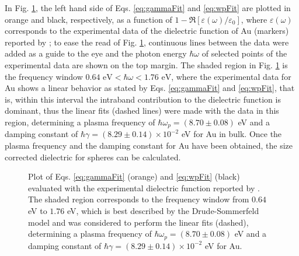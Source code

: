 In Fig. \ref{fig:DrudeFit}, the left hand side of Eqs. \eqref{eq:gammaFit}  and \eqref{eq:wpFit} are plotted in orange and black, respectively, as a function of $1-\Re[\varepsilon(\omega)/ \varepsilon_0]$, where $\varepsilon(\omega)$  corresponds to the experimental data of the dielectric function of Au (markers) reported by \citeauthor{johnson_optical_1972} \cite{johnson_optical_1972}; to ease the read of Fig. \ref{fig:DrudeFit}, continuous lines between the data were added as a guide to the eye and the photon energy $\hbar\omega$ of selected points of the experimental data are shown on the top margin. The shaded region in Fig. \ref{fig:DrudeFit} is the frequency window $0.64\text{ eV} < \hbar\omega < 1.76 \text{ eV}$, where the experimental data for Au shows a linear behavior as stated by Eqs. \eqref{eq:gammaFit}  and \eqref{eq:wpFit}, that is, within this interval  the intraband contribution to the dielectric function is dominant, thus the linear fits (dashed lines) were made with the data in this region, determining a plasma frequency of $\hbar\omega_p =(8.70\pm0.08)$ eV and a damping constant of $\hbar\gamma = (8.29 \pm 0.14)\times 10^{-2}$ eV for Au in bulk. Once the plasma frequency and the damping constant for Au have been obtained, the size corrected dielectric for spheres can be calculated.
 
 \begin{figure}[h!]
\def\svgwidth{.85\textwidth} \small\centering
{}
\caption[Plasma frequency and damping constant determination for Au]{Plot of Eqs. \eqref{eq:gammaFit} (orange) and \eqref{eq:wpFit} (black) evaluated with the experimental dielectric function reported by \citeauthor{johnson_optical_1972} \cite{johnson_optical_1972}. The shaded region corresponds to the frequency window from $0.64$ eV to $1.76$ eV, which is best described by the Drude-Sommerfeld model and  was considered to perform the linear fits (dashed), determining a plasma frequency of $\hbar\omega_p =(8.70\pm0.08)$ eV and a damping constant of $\hbar\gamma = (8.29 \pm 0.14)\times 10^{-2}$ eV for Au. }
\label{fig:DrudeFit}
\end{figure}



